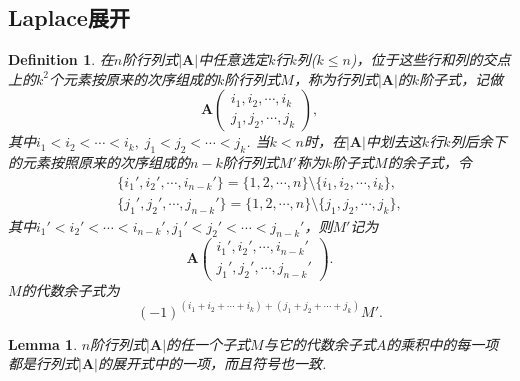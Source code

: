 \documentclass{article}
\newtheorem{lemma}[theorem]{Lemma}
\newtheorem{definition}[theorem]{Definition}
\newcommand{\mbf}[1]{\bm{#1}}
\begin{document}
\newpage
\subsection{Laplace展开}
\begin{definition}
\rm 在$n$阶行列式$|\mbf{A}|$中任意选定$k$行$k$列($k \leq n$)，位于这些行和列的交点上的$k^2$个元素按原来的次序组成的$k$阶行列式$M$，称为行列式$|\mbf{A}|$的{\color{red}$k$阶子式}，记做
$$
\mbf{A}\begin{pmatrix}
i_1,i_2,\cdots,i_k \\
j_1,j_2,\cdots,j_k
\end{pmatrix},
$$
其中$i_1 < i_2 < \cdots < i_k,\; j_1 < j_2 < \cdots < j_k$. 当$k < n$时，在$|\mbf{A}|$中划去这$k$行$k$列后余下的元素按照原来的次序组成的$n-k$阶行列式$M'$称为{\color{red}$k$阶子式$M$的余子式}，令
$$
\begin{array}{ll}
\{i_1',i_2',\cdots, i_{n-k}'\} = \{1,2,\cdots,n\}\setminus\{i_1,i_2,\cdots,i_k\}, \\
\{j_1',j_2',\cdots, j_{n-k}'\} = \{1,2,\cdots,n\}\setminus\{j_1,j_2,\cdots,j_k\},
\end{array}
$$
其中$i_1'< i_2'<\cdots < i_{n-k}',j_1' < j_2' < \cdots < j_{n-k}'$，则$M'$记为
$$
\mbf{A}\begin{pmatrix}
i_1',i_2',\cdots, i_{n-k}' \\
j_1',j_2',\cdots, j_{n-k}'
\end{pmatrix}.
$$
{\color{red}$M$的代数余子式}为
$$
(-1)^{(i_1+i_2+\cdots+i_k) + (j_1+j_2+\cdots+j_k)}M'.
$$
\end{definition}

\begin{lemma}\label{laplace: l1}
\rm $n$阶行列式$|\mbf{A}|$的任一个子式$M$与它的代数余子式$A$的乘积中的每一项都是行列式$|\mbf{A}|$的展开式中的一项，而且符号也一致.
\end{lemma}
\end{document}
